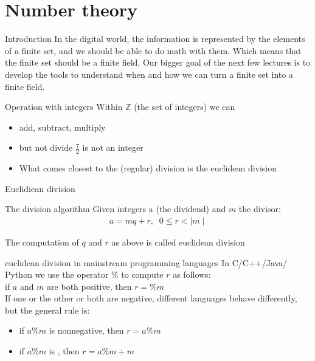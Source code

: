     \section{Number theory}
    \begin{parag}{Introduction}
        In the digital world, the information is represented by the elements of a finite set, and we should be able to do math with them. Which means that the finite set should be a finite field. Our bigger goal of the next few lectures is to develop the tools to understand when and how we can turn a finite set into a finite field.
    \end{parag}
    
    \begin{parag}{Operation with integers}
        Within $ \mathbb{Z}$ (the set of integers) we can
        \begin{itemize}
            \item add, subtract, multiply
            \item but not divide $ \frac{7}{2}$ is not an integer
            \item What comes closest to the (regular) division is the euclidean division
        \end{itemize}
    \end{parag}
    
    \begin{parag}{Euclidiean division}
        \begin{subparag}{The division algorithm}
            Given integers a (the dividend) and $m$ the divisor:
            \begin{align*}
                a = mq + r, \; \; 0 \leq r < \mid m \mid
            \end{align*}
            \begin{framedremark}
                The computation of $q$ and $r$ as above is called euclidean division
            \end{framedremark}
        \end{subparag}
     
        \begin{subparag}{euclidean division in mainstream programming languages}
            In  C/C++/Java/ Python we use the operator \% to compute $r$ as follows:\\
            if $a$ and $m$ are both positive, then $r = \% m$\\
            If one or the other or both are negative, different languages behave differently, but the general rule is:
            \begin{itemize}
                \item if $ a \% m$ is nonnegative, then $r  = a \% m$
                \item if $ a \% m$ is , then $r = a \% m + m$
            \end{itemize}

            
        \end{subparag}
    \end{parag}
    
